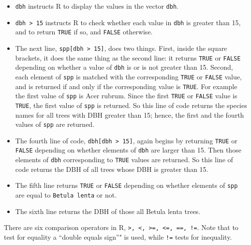 \documentclass[]{krantz}
\providecommand{\tightlist}{%
  \setlength{\itemsep}{0pt}\setlength{\parskip}{0pt}}
\theoremstyle{definition}
\theoremstyle{definition}
\theoremstyle{definition}
\theoremstyle{remark}
\begin{document}
\begin{itemize}
\tightlist
\item
  \texttt{dbh} instructs R to display the values in the vector
  \texttt{dbh}.
\item
  \texttt{dbh\ \textgreater{}\ 15} instructs R to check whether each
  value in \texttt{dbh} is greater than 15, and to return \texttt{TRUE}
  if so, and \texttt{FALSE} otherwise.
\item
  The next line, \texttt{spp{[}dbh\ \textgreater{}\ 15{]}}, does two
  things. First, inside the square brackets, it does the same thing as
  the second line: it returns \texttt{TRUE} or \texttt{FALSE} depending
  on whether a value of \texttt{dbh} is or is not greater than 15.
  Second, each element of \texttt{spp} is matched with the corresponding
  \texttt{TRUE} or \texttt{FALSE} value, and is returned if and only if
  the corresponding value is \texttt{TRUE}. For example the first value
  of \texttt{spp} is Acer rubrum. Since the first \texttt{TRUE} or
  \texttt{FALSE} value is \texttt{TRUE}, the first value of \texttt{spp}
  is returned. So this line of code returns the species names for all
  trees with DBH greater than 15; hence, the first and the fourth values
  of \texttt{spp} are returned.
\item
  The fourth line of code, \texttt{dbh{[}dbh\ \textgreater{}\ 15{]}},
  again begins by returning \texttt{TRUE} or \texttt{FALSE} depending on
  whether elements of \texttt{dbh} are larger than 15. Then those
  elements of \texttt{dbh} corresponding to \texttt{TRUE} values are
  returned. So this line of code returns the DBH of all trees whose DBH
  is greater than 15.
\item
  The fifth line returns \texttt{TRUE} or \texttt{FALSE} depending on
  whether elements of \texttt{spp} are equal to \texttt{Betula\ lenta}
  or not.
\item
  The sixth line returns the DBH of those all Betula lenta trees.
\end{itemize}

There are six comparison operators in R,
\texttt{\textgreater{},\ \textless{},\ \textgreater{}=,\ \textless{}=,\ ==,\ !=}.
Note that to test for equality a ``double equals sign''" is used, while
\texttt{!=} tests for inequality.



\backmatter
\printindex
\end{document}
